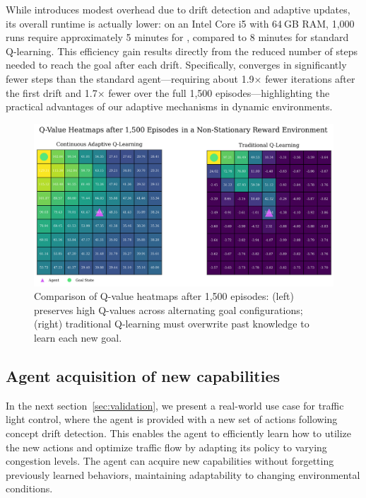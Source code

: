 While \adaptiverl introduces modest overhead due to drift detection and adaptive updates, its overall runtime is actually lower: on an Intel Core i5 with 64 GB RAM, 1,000 runs require approximately 5 minutes for \adaptiverl, compared to 8 minutes for standard Q-learning. This efficiency gain results directly from the reduced number of steps needed to reach the goal after each drift. Specifically, \adaptiverl converges in significantly fewer steps than the standard agent—requiring about 1.9× fewer iterations after the first drift and 1.7× fewer over the full 1,500 episodes—highlighting the practical advantages of our adaptive mechanisms in dynamic environments.

\begin{figure}
    \centering
    \includegraphics[width=\textwidth]{figures/q_map_comp.png}
    \caption{Comparison of Q-value heatmaps after 1,500 episodes: (left) \adaptiverl preserves high Q-values across alternating goal configurations; (right) traditional Q-learning must overwrite past knowledge to learn each new goal.}
    \label{fig:q-value-comp}
\end{figure}

\subsection{Agent acquisition of new capabilities}
In the next section~\ref{sec:validation}, we present a real-world use case for traffic light control, where the agent is provided with a new set of actions following concept drift detection. This enables the agent to efficiently learn how to utilize the new actions and optimize traffic flow by adapting its policy to varying congestion levels. The agent can acquire new capabilities without forgetting previously learned behaviors, maintaining adaptability to changing environmental conditions.

\endinput

